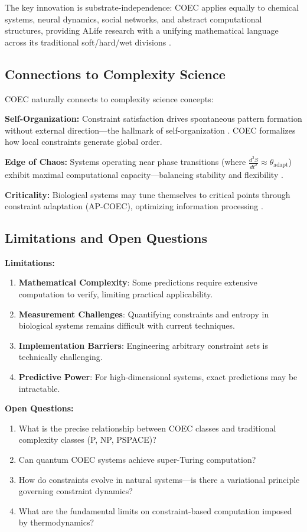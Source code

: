 \documentclass[11pt]{article}
\begin{document}
The key innovation is substrate-independence: COEC applies equally to chemical systems, neural dynamics, social networks, and abstract computational structures, providing ALife research with a unifying mathematical language across its traditional soft/hard/wet divisions \citep{aguilar2014past,bedau2003artificial}.

\subsection{Connections to Complexity Science}

COEC naturally connects to complexity science concepts:

\textbf{Self-Organization:} Constraint satisfaction drives spontaneous pattern formation without external direction—the hallmark of self-organization \citep{heylighen2001science}. COEC formalizes how local constraints generate global order.

\textbf{Edge of Chaos:} Systems operating near phase transitions (where $\frac{d^2S}{dt^2} \approx \theta_{\text{adapt}}$) exhibit maximal computational capacity—balancing stability and flexibility \citep{langton1990computation}.

\textbf{Criticality:} Biological systems may tune themselves to critical points through constraint adaptation (AP-COEC), optimizing information processing \citep{beggs2008neuronal}.

\subsection{Limitations and Open Questions}

\textbf{Limitations:}
\begin{enumerate}
\item \textbf{Mathematical Complexity}: Some predictions require extensive computation to verify, limiting practical applicability.
\item \textbf{Measurement Challenges}: Quantifying constraints and entropy in biological systems remains difficult with current techniques.
\item \textbf{Implementation Barriers}: Engineering arbitrary constraint sets is technically challenging.
\item \textbf{Predictive Power}: For high-dimensional systems, exact predictions may be intractable.
\end{enumerate}

\textbf{Open Questions:}
\begin{enumerate}
\item What is the precise relationship between COEC classes and traditional complexity classes (P, NP, PSPACE)?
\item Can quantum COEC systems achieve super-Turing computation?
\item How do constraints evolve in natural systems—is there a variational principle governing constraint dynamics?
\item What are the fundamental limits on constraint-based computation imposed by thermodynamics?
\end{enumerate}
\end{document}
